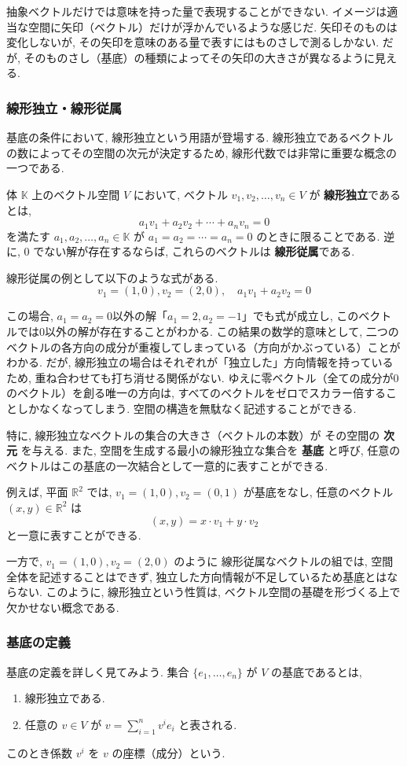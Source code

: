 \documentclass{ltjsarticle}
\begin{document}
抽象ベクトルだけでは意味を持った量で表現することができない. 
イメージは適当な空間に矢印（ベクトル）だけが浮かんでいるような感じだ. 
矢印そのものは変化しないが, その矢印を意味のある量で表すにはものさしで測るしかない. 
だが, そのものさし（基底）の種類によってその矢印の大きさが異なるように見える. 

\subsubsection{線形独立・線形従属}
基底の条件において, 線形独立という用語が登場する. 
線形独立であるベクトルの数によってその空間の次元が決定するため, 線形代数では非常に重要な概念の一つである. 

体 $\mathbb{K}$ 上のベクトル空間 $V$ において, 
ベクトル $v_1, v_2, \dots, v_n \in V$ が
\textbf{線形独立}であるとは,
\[
a_1 v_1 + a_2 v_2 + \cdots + a_n v_n = 0
\]
を満たす $a_1, a_2, \dots, a_n \in \mathbb{K}$ が
$a_1 = a_2 = \cdots = a_n = 0$
のときに限ることである. 
逆に, 0 でない解が存在するならば, 
これらのベクトルは \textbf{線形従属}である. 

線形従属の例として以下のような式がある. 
\[
v_1 = (1,0) , v_2 = (2,0) , \quad a_1 v_1 + a_2 v_2 = 0
\]

この場合, $a_1=a_2=0$以外の解「$a_1=2, a_2=-1$」でも式が成立し, このベクトルでは0以外の解が存在することがわかる. 
この結果の数学的意味として, 二つのベクトルの各方向の成分が重複してしまっている（方向がかぶっている）ことがわかる. 
だが, 線形独立の場合はそれぞれが「独立した」方向情報を持っているため, 
重ね合わせても打ち消せる関係がない. 
ゆえに零ベクトル（全ての成分が0のベクトル）を創る唯一の方向は, 
すべてのベクトルをゼロでスカラー倍することしかなくなってしまう. 
空間の構造を無駄なく記述することができる. 

特に, 線形独立なベクトルの集合の大きさ（ベクトルの本数）が
その空間の \textbf{次元} を与える. 
また, 空間を生成する最小の線形独立な集合を \textbf{基底} と呼び, 
任意のベクトルはこの基底の一次結合として一意的に表すことができる. 

例えば, 平面 $\mathbb{R}^2$ では, 
$v_1=(1,0), v_2=(0,1)$ が基底をなし, 
任意のベクトル $(x,y) \in \mathbb{R}^2$ は 
\[
(x,y) = x \cdot v_1 + y \cdot v_2
\]
と一意に表すことができる. 

一方で, $v_1=(1,0), v_2=(2,0)$ のように
線形従属なベクトルの組では, 
空間全体を記述することはできず, 
独立した方向情報が不足しているため基底とはならない. 
このように, 線形独立という性質は,
ベクトル空間の基礎を形づくる上で欠かせない概念である.

\subsubsection{基底の定義}
基底の定義を詳しく見てみよう. 
集合 $\{e_1,\dots,e_n\}$ が $V$ の基底であるとは, 
\begin{enumerate}
    \item 線形独立である. 
    \item 任意の $v \in V$ が $v=\sum_{i=1}^n v^i e_i$ と表される. 
\end{enumerate}
このとき係数 $v^i$ を $v$ の座標（成分）という. 
\end{document}
